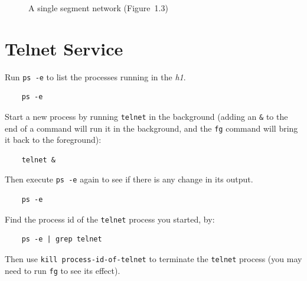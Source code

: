 \documentclass{UTNetLab}
\begin{document}
\begin{center}
\begin{minipage}{0.48\textwidth}
\begin{flushright}
\begin{figure}[H]
                \caption{A single segment network (Figure~1.3)}
            \end{figure}
        \end{flushright}
    \end{minipage}
\end{center}

\section{Telnet Service}
Run \lstinline{ps -e} to list the processes running in the \textit{h1}.

\begin{lstlisting}
	ps -e
\end{lstlisting}

Start a new process by running \lstinline{telnet} in the background (adding an \lstinline{&} to the end of a command will run it in the background, and the \lstinline{fg} command will bring it back to the foreground):

\begin{lstlisting}
	telnet &
\end{lstlisting}

Then execute \lstinline{ps -e} again to see if there is any change in its output.

\newpage
{}
\begin{lstlisting}
	ps -e
\end{lstlisting}

Find the process id of the \lstinline{telnet} process you started, by:

\begin{lstlisting}
	ps -e | grep telnet
\end{lstlisting}

Then use \lstinline[emph={process-id-of-telnet}]{kill process-id-of-telnet} to terminate the \lstinline{telnet} process (you may need to run \lstinline{fg} to see its effect).
\end{document}
